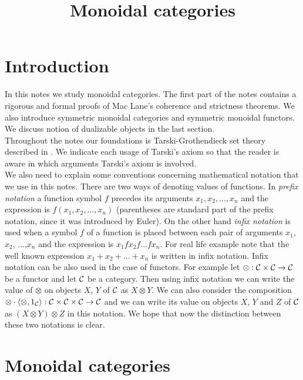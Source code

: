 



\title{Monoidal categories}
\date{}
\maketitle

\section{Introduction}
\noindent
In this notes we study monoidal categories. The first part of the notes contains a rigorous and formal proofs of Mac Lane's coherence and strictness theorems. We also introduce symmetric monoidal categories and symmetric monoidal functors. We discuss notion of dualizable objects in the last section.\\
Throughout the notes our foundations is Tarski-Grothendieck set theory described in {\cite[Introduction]{Presheaves}}. We indicate each usage of Tarski's axiom so that the reader is aware in which arguments Tarski's axiom is involved.\\
We also need to explain some conventions concerning mathematical notation that we use in this notes. There are two ways of denoting values of functions. In \textit{prefix notation} a function symbol $f$ precedes its arguments $x_1,x_2,...,x_n$ and the expression is $f(x_1,x_2,...,x_n)$ (parentheses are standard part of the prefix notation, since it was introduced by Euler). On the other hand \textit{infix notation} is used when a symbol $f$ of a function is placed between each pair of arguments $x_1$, $x_2$, ...,$x_n$ and the expression is $x_1 f x_2 f...fx_n$. For real life example note that the well known expression $x_1+x_2+...+x_n$ is written in infix notation. Infix notation can be also used in the case of functors. For example let $\otimes:{\mathcal C}\times {\mathcal C}\rightarrow {\mathcal C}$ be a functor and let ${\mathcal C}$ be a category. Then using infix notation we can write the value of $\otimes$ on objects $X$, $Y$ of ${\mathcal C}$ as $X\otimes Y$. We can also consider the composition $\otimes\cdot \langle \otimes, 1_{{\mathcal C}}\rangle:{\mathcal C}\times {\mathcal C}\times {\mathcal C}\rightarrow {\mathcal C}$ and we can write its value on objects $X$, $Y$ and $Z$ of ${\mathcal C}$ as $(X\otimes Y)\otimes Z$ in this notation. We hope that now the distinction between these two notations is clear.

\section{Monoidal categories}

